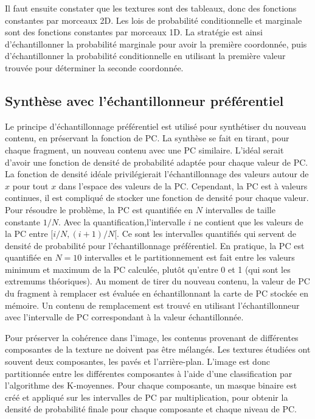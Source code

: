 Il faut ensuite constater que les textures sont des tableaux, donc des fonctions constantes par morceaux 2D. Les lois de probabilité conditionnelle et marginale sont des fonctions constantes par morceaux 1D. La stratégie est ainsi d'échantillonner la probabilité marginale pour avoir la première coordonnée, puis d'échantillonner la probabilité conditionnelle en utilisant la première valeur trouvée pour déterminer la seconde coordonnée.

\subsection{Synthèse avec l'échantillonneur préférentiel}

Le principe d'échantillonnage préférentiel est utilisé pour synthétiser du nouveau contenu, en préservant la fonction de PC. La synthèse se fait en tirant, pour chaque fragment, un nouveau contenu avec une PC similaire. L'idéal serait d'avoir une fonction de densité de probabilité adaptée pour chaque valeur de PC. La fonction de densité idéale privilégierait l'échantillonnage des valeurs autour de $x$ pour tout $x$ dans l'espace des valeurs de la PC. Cependant, la PC est à valeurs continues, il est compliqué de stocker une fonction de densité pour chaque valeur. Pour résoudre le problème, la PC est quantifiée en $N$ intervalles de taille constante $1/N$. Avec la quantification,l'intervalle $i$ ne contient que les valeurs de la PC entre $[i/N, (i+1)/N[$. Ce sont les intervalles quantifiés qui servent de densité de probabilité pour l'échantillonnage préférentiel. En pratique, la PC est quantifiée en $N=10$ intervalles et le partitionnement est fait entre les valeurs minimum et maximum de la PC calculée, plutôt qu'entre 0 et 1 (qui sont les extremums théoriques). Au moment de tirer du nouveau contenu, la valeur de PC du fragment à remplacer est évaluée en échantillonnant la carte de PC stockée en mémoire. Un contenu de remplacement est trouvé en utilisant l'échantillonneur avec l'intervalle de PC correspondant à la valeur échantillonnée.

\bigskip

Pour préserver la cohérence dans l'image, les contenus provenant de différentes composantes de la texture ne doivent pas être mélangés. Les textures étudiées ont souvent deux composantes, les pavés et l'arrière-plan. L'image est donc partitionnée entre les différentes composantes à l'aide d'une classification par l'algorithme des K-moyennes. Pour chaque composante, un masque binaire est créé et appliqué sur les intervalles de PC par multiplication, pour obtenir la densité de probabilité finale pour chaque composante et chaque niveau de PC.

